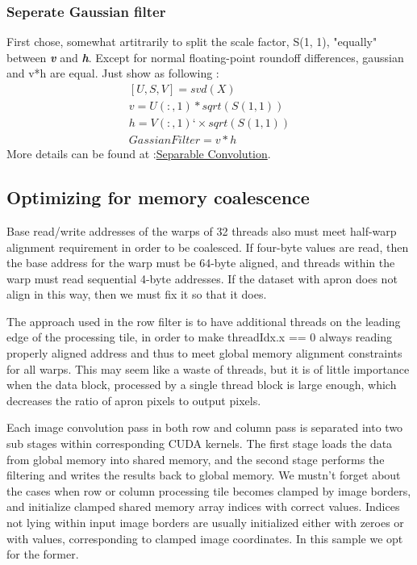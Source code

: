 \subsubsection{Seperate Gaussian filter}
First chose, somewhat artitrarily to split the scale factor, S(1, 1), "equally" between \textit{\textbf{v}} and \textit{\textbf{h}}. Except for normal floating-point roundoff differences, gaussian and v*h are equal. Just show as following : 
\begin{displaymath}
\begin{gathered}
\left[ U, S, V \right]= svd(X)\\
v = U(:, 1) * sqrt(S(1, 1))\\
h = V(:, 1)‘ × sqrt(S(1, 1))\\
GassianFilter = v * h
\end{gathered}
\end{displaymath}
More details can be found at :\href{http://blogs.mathworks.com/steve/2006/11/28/separable-convolution-part-2/}{Separable Convolution}.

\subsection{Optimizing for memory coalescence}
Base read/write addresses of the warps of 32 threads also must meet half-warp
alignment requirement in order to be coalesced. If four-byte values are read, then the base
address for the warp must be 64-byte aligned, and threads within the warp must read
sequential 4-byte addresses. If the dataset with apron does not align in this way, then we
must fix it so that it does.

The approach used in the row filter is to have additional threads on the leading edge
of the processing tile, in order to make threadIdx.x == 0 always reading properly aligned
address and thus to meet global memory alignment constraints for all warps. This may seem
like a waste of threads, but it is of little importance when the data block, processed by a
single thread block is large enough, which decreases the ratio of apron pixels to output
pixels.

Each image convolution pass in both row and column pass is separated into two
sub stages within corresponding CUDA kernels. The first stage loads the data from global
memory into shared memory, and the second stage performs the filtering and writes the
results back to global memory. We mustn’t forget about the cases when row or column
processing tile becomes clamped by image borders, and initialize clamped shared memory array indices with correct values. Indices not lying within input image borders are usually
initialized either with zeroes or with values, corresponding to clamped image coordinates. In
this sample we opt for the former.

